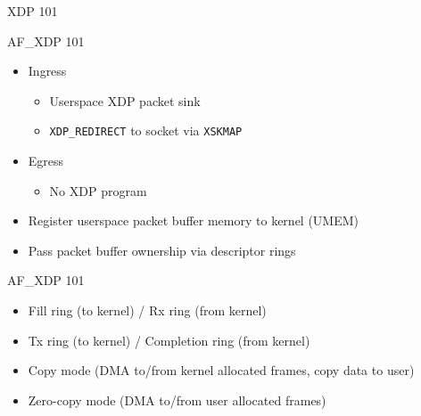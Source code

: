 \documentclass[aspectratio=169]{beamer}
\begin{document}
  \begin{frame}{XDP 101}
    \centering{}
  \end{frame}

  \begin{frame}{AF\_XDP 101}
    \begin{itemize}
    \item Ingress
      \begin{itemize}
      \item Userspace XDP packet sink
      \item {\tt XDP\_REDIRECT} to socket via {\tt XSKMAP}
      \end{itemize}
    \item Egress
      \begin{itemize}
      \item No XDP program
      \end{itemize}
    \item Register userspace packet buffer memory to kernel (UMEM)
    \item Pass packet buffer ownership via descriptor rings
    \end{itemize}
  \end{frame}

  \begin{frame}{AF\_XDP 101}
    \centering{}
    \begin{itemize}
    \item Fill ring (to kernel) / Rx ring (from kernel)
    \item Tx ring (to kernel) / Completion ring (from kernel)
    \item Copy mode (DMA to/from kernel allocated frames, copy data to user)
    \item Zero-copy mode (DMA to/from user allocated frames)
    \end{itemize}
  \end{frame}
\end{document}
